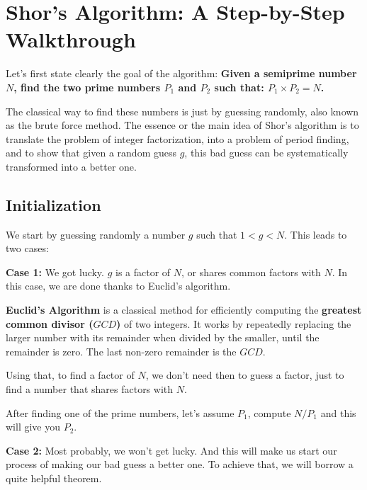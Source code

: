 \section{Shor's Algorithm: A Step-by-Step Walkthrough}

Let's first state clearly the goal of the algorithm:
\textbf{Given a semiprime number $N$, find the two prime numbers $P_1$ and
$P_2$ such that: $P_1 \times P_2 = N$.}

The classical way to find these numbers is just by guessing randomly, also
known as the brute force method. The essence or the main idea of Shor's
algorithm is to translate the problem of integer factorization, into a problem
of period finding, and to show that given a random guess $g$, this bad guess
can be systematically transformed into a better one.

\subsection{Initialization}

We start by guessing randomly a number $g$ such that $1 < g < N$. This leads
to two cases:

\textbf{Case 1:} We got lucky. $g$ is a factor of $N$, or shares common
factors with $N$. In this case, we are done thanks to Euclid's algorithm.

\begin{smjdefinition}
\textbf{Euclid's Algorithm} is a classical method for efficiently computing
the \textbf{greatest common divisor ($GCD$)} of two integers. It works by
repeatedly replacing the larger number with its remainder when divided by the
smaller, until the remainder is zero. The last non-zero remainder is the $GCD$.
\end{smjdefinition}

\begin{smjnote}
Using that, to find a factor of $N$, we don't need then to guess a factor,
just to find a number that shares factors with $N$.
\end{smjnote}

After finding one of the prime numbers, let's assume $P_1$, compute $N/P_1$
and this will give you $P_2$.

\textbf{Case 2:} Most probably, we won't get lucky.
And this will make us start our process of making our bad guess a better one.
To achieve that, we will borrow a quite helpful theorem.

